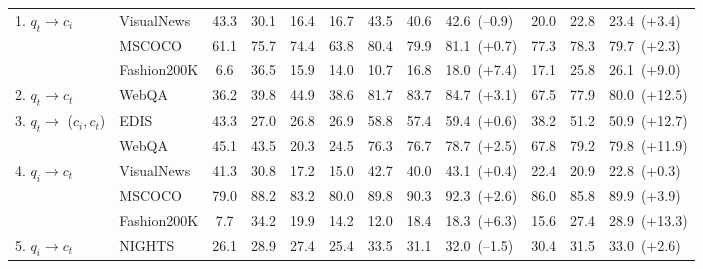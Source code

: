 \begin{table}[ht!]
{\begin{tabular}{llcccc|ccl|ccl}
         \multirow{3}{*}{1. $q_t \to c_i$}
         & VisualNews               & 43.3 & 30.1 & 16.4 & 16.7 & 43.5 & 40.6  & 42.6~\textcolor{negative}{\footnotesize (--0.9)} & 20.0 & 22.8 & 23.4~\textcolor{positive}{\footnotesize (+3.4)}\\
         & MSCOCO                   & 61.1 & 75.7 & 74.4 & 63.8 & 80.4 & 79.9  & 81.1~\textcolor{positive}{\footnotesize (+0.7)} & 77.3 & 78.3 & 79.7~\textcolor{positive}{\footnotesize (+2.3)}\\
         & Fashion200K              & 6.6 & 36.5 & 15.9 & 14.0 & 10.7 & 16.8  & 18.0~\textcolor{positive}{\footnotesize (+7.4)} & 17.1 & 25.8 & 26.1~\textcolor{positive}{\footnotesize (+9.0)}\\
         \midrule
         2. $q_t \to c_t$
         & WebQA         & 36.2 & 39.8 & 44.9 & 38.6 & 81.7 & 83.7  & 84.7~\textcolor{positive}{\footnotesize (+3.1)} & 67.5 & 77.9 & 80.0~\textcolor{positive}{\footnotesize (+12.5)}\\
         \midrule
         \multirow{2}{*}{3. $q_t \to$ ($c_i, c_t$)}
         & EDIS                     & 43.3 & 27.0 & 26.8 & 26.9 & 58.8 & 57.4  & 59.4~\textcolor{positive}{\footnotesize (+0.6)} & 38.2 & 51.2 & 50.9~\textcolor{positive}{\footnotesize (+12.7)}\\
         & WebQA                    & 45.1 & 43.5 & 20.3 & 24.5 & 76.3 & 76.7  & 78.7~\textcolor{positive}{\footnotesize (+2.5)} & 67.8 & 79.2 & 79.8~\textcolor{positive}{\footnotesize (+11.9)}\\
         \midrule
         \multirow{3}{*}{4. $q_i \to c_t$}
         & VisualNews               & 41.3 & 30.8 & 17.2 & 15.0 & 42.7 & 40.0  & 43.1~\textcolor{positive}{\footnotesize (+0.4)} & 22.4 & 20.9 & 22.8~\textcolor{positive}{\footnotesize (+0.3)}\\
         & MSCOCO                   & 79.0 & 88.2 & 83.2 & 80.0 & 89.8 & 90.3  & 92.3~\textcolor{positive}{\footnotesize (+2.6)} & 86.0 & 85.8 & 89.9~\textcolor{positive}{\footnotesize (+3.9)}\\
         & Fashion200K              & 7.7 & 34.2 & 19.9 & 14.2 & 12.0 & 18.4  & 18.3~\textcolor{positive}{\footnotesize (+6.3)} & 15.6 & 27.4 & 28.9~\textcolor{positive}{\footnotesize (+13.3)}\\
         \midrule
         \multirow{1}{*}{5. $q_i \to c_t$}
         & NIGHTS                   & 26.1 & 28.9 & 27.4 & 25.4 & 33.5 & 31.1  & 32.0~\textcolor{negative}{\footnotesize (--1.5)} & 30.4 & 31.5 & 33.0~\textcolor{positive}{\footnotesize (+2.6)}\\

\end{tabular}}
\end{table}
